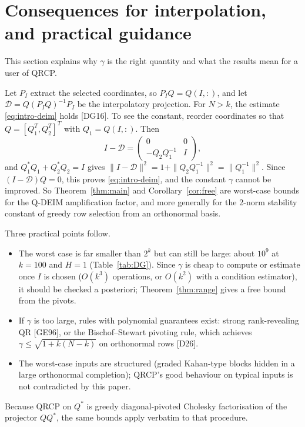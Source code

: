 \documentclass[11pt,a4paper]{article}
\theoremstyle{definition}
\numberwithin{equation}{section}
\begin{document}
\section{Consequences for interpolation, and practical guidance}\label{sec:interp}

This section explains why $\gamma$ is the right quantity and what the results mean for a user of QRCP.

Let $P_I$ extract the selected coordinates, so $P_IQ=Q(I,:)$, and let $\mathcal D=Q(P_IQ)^{-1}P_I$ be the
interpolatory projection. For $N>k$, the estimate \eqref{eq:intro-deim} holds [DG16]. To see the constant, reorder
coordinates so that $Q=[Q_1^T,Q_2^T]^T$ with $Q_1=Q(I,:)$. Then
\[
 I-\mathcal D=\begin{pmatrix}0&0\\-Q_2Q_1^{-1}&I\end{pmatrix},
\]
and $Q_1^*Q_1+Q_2^*Q_2=I$ gives $\|I-\mathcal D\|^2=1+\|Q_2Q_1^{-1}\|^2=\|Q_1^{-1}\|^2$. Since $(I-\mathcal D)Q=0$,
this proves \eqref{eq:intro-deim}, and the constant $\gamma$ cannot be improved. So Theorem~\ref{thm:main} and
Corollary~\ref{cor:free} are worst-case bounds for the Q-DEIM amplification factor, and more generally for the
2-norm stability constant of greedy row selection from an orthonormal basis.

Three practical points follow.
\begin{itemize}
\item The worst case is far smaller than $2^k$ but can still be large: about $10^{9}$ at $k=100$ and $H=1$
  (Table~\ref{tab:DG}). Since $\gamma$ is cheap to compute or estimate once $I$ is chosen ($O(k^3)$ operations, or
  $O(k^2)$ with a condition estimator), it should be checked a posteriori; Theorem~\ref{thm:range} gives a free
  bound from the pivots.
\item If $\gamma$ is too large, rules with polynomial guarantees exist: strong rank-revealing QR [GE96], or the
  Bischof--Stewart pivoting rule, which achieves $\gamma\le\sqrt{1+k(N-k)}$ on orthonormal rows [D26].
\item The worst-case inputs are structured (graded Kahan-type blocks hidden in a large orthonormal completion);
  QRCP's good behaviour on typical inputs is not contradicted by this paper.
\end{itemize}
Because QRCP on $Q^*$ is greedy diagonal-pivoted Cholesky factorisation of the projector $QQ^*$, the same bounds
apply verbatim to that procedure.
\end{document}
